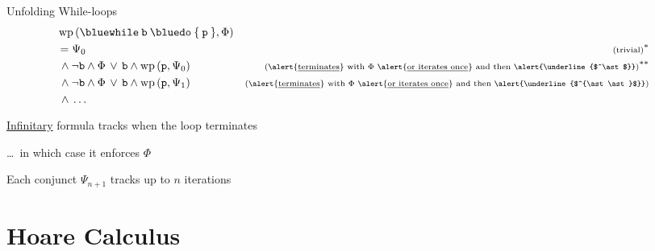 \documentclass{beamer}
\begin{document}
\begin{frame}{Unfolding While-loops}
        \begin{align*}
         & \, \mathrm{wp} \, ({\mathtt{{\blue while} \> b \> {\blue do} \> \{ \> p \> \}} }, \Phi)
         \\
         & = \Psi_0
         & {\scriptsize \text{(trivial)}^\ast }
         \\
         & \, \wedge \neg \prog{b} \wedge \Phi \, \vee \, \prog{b} \wedge \mathrm{wp} \, (\prog{p},\Psi_0)
         & {\scriptsize \text{(\alert{\underline{terminates}} with $\Phi$ 
         \alert{\underline{or iterates once}} and then \alert{\underline{$^\ast$}})}^{\ast \ast} }
         \\
         & \, \wedge \neg \prog{b} \wedge \Phi \, \vee \, \prog{b} \wedge \mathrm{wp} \, (\prog{p},\Psi_1)
         & {\scriptsize \text{(\alert{\underline{terminates}} 
                         with $\Phi$  \alert{\underline{or iterates once}} 
         and then \alert{\underline{$^{\ast \ast}$}})} }
         \\
         & \, \wedge \, \dots
        \end{align*}
        
        \pause
        \alert{\underline{Infinitary}} formula tracks when the loop terminates

        \dots\ in which case it enforces $\Phi$

        Each conjunct $\Psi_{n+1}$ tracks up to $n$ iterations
\end{frame}

\section{Hoare Calculus}



\end{document}
